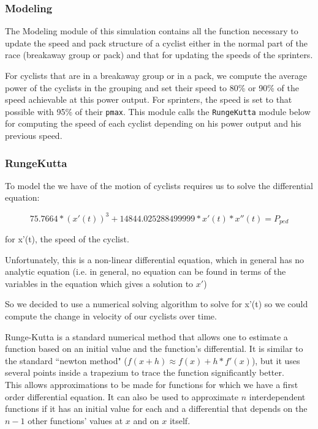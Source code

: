 \documentclass[10pt, a4paper]{report}
\begin{document}
\subsubsection{Modeling}

The Modeling module of this simulation contains all the function necessary to update the speed and pack structure of a cyclist either in the normal part of the race (breakaway group or pack) and that for updating the speeds of the sprinters. \newline \par

For cyclists that are in a breakaway group or in a pack, we compute the average power of the cyclists in the grouping and set their speed to 80\% or 90\% of the speed achievable at this power output. For sprinters, the speed is set to that possible with 95\% of their \texttt{pmax}. This module calls the \texttt{RungeKutta} module below for computing the speed of each cyclist depending on his power output and his previous speed. \newline \par

\subsubsection{RungeKutta}

To model the we have of the motion of cyclists requires us to solve the differential equation:

$$ 75.7664 *(x'(t))^{3} + 14844.025288499999 * x'(t) * x''(t) = P_{ped}$$

\noindent for x'(t), the speed of the cyclist. \newline \par

Unfortunately, this is a non-linear differential equation, which in general has no analytic equation (i.e. in general, no equation can be found in terms of the variables in the equation which gives a solution to $x'$) \newline \par

So we decided to use a numerical solving algorithm to solve for x'(t) so we could compute the change in velocity of our cyclists over time. \newline \par

Runge-Kutta is a standard numerical method that allows one to estimate a function based on an initial value and the function's differential. It is similar to the standard ``newton method" ($f(x + h) \approx f(x) + h*f'(x)$), but it uses several points inside a trapezium to trace the function significantly better. \\
\newline
This allows approximations to be made for functions for which we have a first order differential equation. It can also be used to approximate $n$ interdependent functions if it has an initial value for each and a differential that depends on the $n - 1$ other functions' values at $x$ and on $x$ itself.\\
\end{document}
